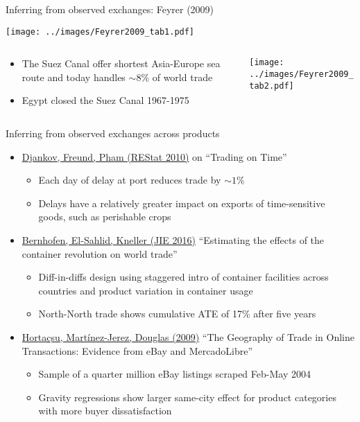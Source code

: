 \documentclass[10pt,notes=hide,aspectratio=169]{beamer}
\begin{document}
\begin{frame}{Inferring from observed exchanges: Feyrer (2009)}
\begin{center}
\texttt{[image: ../images/Feyrer2009\_tab1.pdf]}
\end{center}
\vspace{-5mm}
\begin{columns}
\begin{column}{.62\textwidth}
\begin{itemize}
	\item The Suez Canal offer shortest Asia-Europe sea route and today handles $\sim 8\%$ of world trade
	\item Egypt closed the Suez Canal 1967-1975
\end{itemize}
\end{column}
\begin{column}{.36\textwidth}
\texttt{[image: ../images/Feyrer2009\_tab2.pdf]}
\end{column}
\end{columns}
\end{frame}
\begin{frame}{Inferring from observed exchanges across products}
\begin{itemize}
\item \href{https://www.mitpressjournals.org/doi/10.1162/rest.2009.11498}{Djankov, Freund, Pham (REStat 2010)} on ``Trading on Time''
\begin{itemize}
	\item Each day of delay at port reduces trade by $\sim 1\%$
	\item Delays have a relatively greater impact on exports of time-sensitive goods, such as perishable crops
\end{itemize}
\item \href{https://www.sciencedirect.com/science/article/pii/S0022199615001403}{Bernhofen, El-Sahlid, Kneller (JIE 2016)} ``Estimating the effects of the container revolution on world trade''
\begin{itemize}
	\item Diff-in-diffs design using staggered intro of container facilities across countries and product variation in container usage
	\item North-North trade shows cumulative ATE of 17\%  after five years
\end{itemize}
\item \href{http://www.jstor.org/stable/25760347}{Horta\c{c}su, Mart\'{i}nez-Jerez, Douglas (2009)} ``The Geography of Trade in Online Transactions: Evidence from eBay and MercadoLibre''
\begin{itemize}
	\item Sample of a quarter million eBay listings scraped Feb-May 2004
	\item Gravity regressions show larger same-city effect for product categories with more buyer dissatisfaction
\end{itemize}
\end{itemize}
\end{frame}
\end{document}
